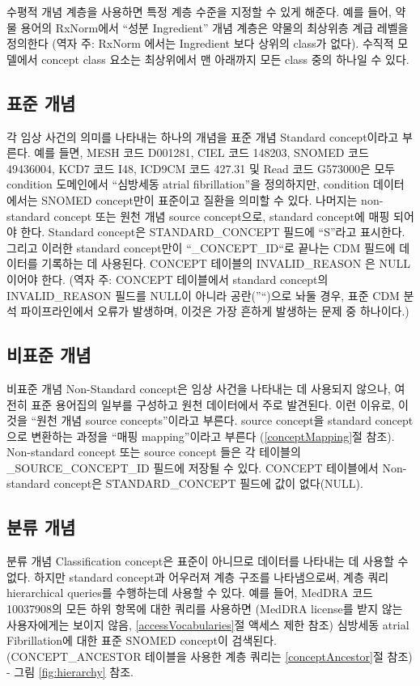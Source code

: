 \documentclass[10.5pt]{book}
\theoremstyle{definition}
\theoremstyle{definition}
\theoremstyle{definition}
\theoremstyle{remark}
\begin{document}
수평적 개념 계층을 사용하면 특정 계층 수준을 지정할 수 있게 해준다. 예를
들어, 약물 용어의 RxNorm에서 ``성분 Ingredient'' 개념 계층은 약물의
최상위층 계급 레벨을 정의한다 (역자 주: RxNorm 에서는 Ingredient 보다
상위의 class가 없다). 수직적 모델에서 concept class 요소는 최상위에서 맨
아래까지 모든 class 중의 하나일 수 있다.

\subsection{표준 개념}\label{standardConcepts}

각 임상 사건의 의미를 나타내는 하나의 개념을 표준 개념 Standard
concept이라고 부른다. 예를 들면, MESH 코드 D001281, CIEL 코드 148203,
SNOMED 코드 49436004, KCD7 코드 I48, ICD9CM 코드 427.31 및 Read 코드
G573000은 모두 condition 도메인에서 ``심방세동 atrial fibrillation''을
정의하지만, condition 데이터에서는 SNOMED concept만이 표준이고 질환을
의미할 수 있다. 나머지는 non-standard concept 또는 원천 개념 source
concept으로, standard concept에 매핑 되어야 한다. Standard concept은
STANDARD\_CONCEPT 필드에 ``S''라고 표시한다. 그리고 이러한 standard
concept만이 ``\_CONCEPT\_ID``로 끝나는 CDM 필드에 데이터를 기록하는 데
사용된다. CONCEPT 테이블의 INVALID\_REASON 은 NULL이어야 한다. (역자 주:
CONCEPT 테이블에서 standard concept의 INVALID\_REASON 필드를 NULL이
아니라 공란(''``)으로 놔둘 경우, 표준 CDM 분석 파이프라인에서 오류가
발생하며, 이것은 가장 흔하게 발생하는 문제 중 하나이다.)

\subsection{비표준 개념}\label{-}

비표준 개념 Non-Standard concept은 임상 사건을 나타내는 데 사용되지
않으나, 여전히 표준 용어집의 일부를 구성하고 원천 데이터에서 주로
발견된다. 이런 이유로, 이것을 ``원천 개념 source concepts''이라고
부른다. source concept을 standard concept으로 변환하는 과정을 ``매핑
mapping''이라고 부른다 (\ref{conceptMapping}절 참조). Non-standard
concept 또는 source concept 들은 각 테이블의 \_SOURCE\_CONCEPT\_ID
필드에 저장될 수 있다. CONCEPT 테이블에서 Non-standard concept은
STANDARD\_CONCEPT 필드에 값이 없다(NULL).

\subsection{분류 개념}\label{-}

분류 개념 Classification concept은 표준이 아니므로 데이터를 나타내는 데
사용할 수 없다. 하지만 standard concept과 어우러져 계층 구조를
나타냄으로써, 계층 쿼리 hierarchical queries를 수행하는데 사용할 수
있다. 예를 들어, MedDRA 코드 10037908의 모든 하위 항목에 대한 쿼리를
사용하면 (MedDRA license를 받지 않는 사용자에게는 보이지 않음,
\ref{accessVocabularies}절 액세스 제한 참조) 심방세동 atrial
Fibrillation에 대한 표준 SNOMED concept이 검색된다. (CONCEPT\_ANCESTOR
테이블을 사용한 계층 쿼리는 \ref{conceptAncestor}절 참조) - 그림
\ref{fig:hierarchy} 참조. 
\end{document}
